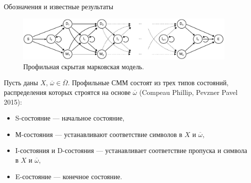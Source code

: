 \documentclass[ucs, notheorems, handout, 10pt]{beamer}
\begin{document}
	\begin{frame}{Обозначения и известные результаты}				
		\begin{figure}[h]
			\includegraphics[width=11cm]{../../report/figure2}
			\caption{Профильная скрытая марковская модель.}  \label{fg:3}
		\end{figure}	
		
		Пусть даны $X$, $\overline{\omega} \in \overline{\Omega}$. Профильные СММ состоят из трех типов состояний, распределения которых строятся на основе $\overline{\omega}$ (Compeau Phillip, Pevzner Pavel 2015):
		\begin{itemize}
			\item S-состояние --- начальное состояние,
			\item М-состояния --- устанавливают соответствие символов в $X$ и $\overline{\omega}$,
			\item I-состояния и D-состояния --- устанавливает соответствие пропуска и символа в $X$ и $\overline{\omega}$,
			\item E-состояние --- конечное состояние.
		\end{itemize}
		
	\end{frame}
\end{document}
